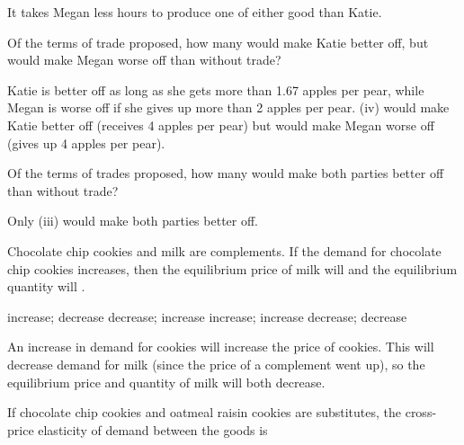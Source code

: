 \documentclass[addpoints,11pt]{exam}
\theoremstyle{definition}
\newcommand{\blank}[0]{\underline{\hspace{3cm}}}
\begin{document}
\begin{questions}
	\begin{solution}
		It takes Megan less hours to produce one of either good than Katie.
	\end{solution}
	
\question \label{q13} Of the terms of trade proposed, how many would make Katie better off, but would make Megan worse off than without trade?

\begin{choices}
\end{choices}

\begin{solution}
	Katie is better off as long as she gets more than 1.67 apples per pear, while Megan is worse off if she gives up more than 2 apples per pear. (iv) would make Katie better off (receives 4 apples per pear) but would make Megan worse off (gives up 4 apples per pear).
\end{solution}
	
\question \label{q14} Of the terms of trades proposed, how many would make both parties better off than without trade?
	
	\begin{choices}
	\end{choices}
	
	\begin{solution}
		Only (iii) would make both parties better off.
	\end{solution}
	
\newpage
		
\question Chocolate chip cookies and milk are complements. If the demand for chocolate chip cookies increases, then the equilibrium price of milk will \blank and the equilibrium quantity will \blank.
	
	\begin{choices}
		\choice increase; decrease
		\choice decrease; increase
		\choice increase; increase
		\CorrectChoice decrease; decrease
	\end{choices}
	
	\begin{solution}
		An increase in demand for cookies will increase the price of cookies. This will decrease demand for milk (since the price of a complement went up), so the equilibrium price and quantity of milk will both decrease.
	\end{solution}
	
	\question If chocolate chip cookies and oatmeal raisin cookies are substitutes, the cross-price elasticity of demand between the goods is
	

\end{questions}
\end{document}
